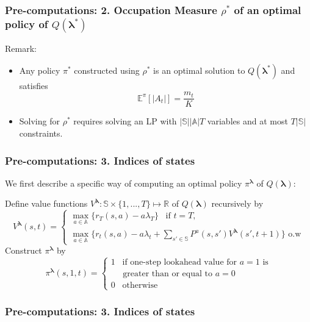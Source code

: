 \documentclass{beamer}
\newcommand{\lambdav}{\pmb{\lambda}}
\newcommand{\substates}{\mathbb{S}}
\newcommand{\subactions}{\mathbb{A}}
\newcommand{\subaction}{a}
\begin{document}
\begin{frame}
\frametitle{Pre-computations: 2. Occupation Measure $\rho^*$ of an optimal policy of $Q(\lambdav^*)$}
Remark: 
\begin{itemize}
\item Any policy $\pi^*$ constructed using $\rho^*$ is an optimal solution to $Q(\lambdav^*)$ and satisfies
\begin{equation}
\mathbb{E}^{\pi}[|A_t|]=\frac{m_t}{K}
\end{equation} 
\item Solving for $\rho^*$ requires solving an LP with $|\substates||\subactions|T$ variables and at most $T|\substates|$ constraints.
\end{itemize}
\end{frame}

\begin{frame}
\frametitle{Pre-computations: 3. Indices of states}

We first describe a specific way of computing an optimal policy $\pi^{\lambdav}$ of $Q(\lambdav)$:

\vspace{0.5cm}
Define value functions $V^{\lambdav}:\substates\times \{1,...,T\}\mapsto \mathbb{R}$ of $Q(\lambdav)$ recursively by
\begin{equation}
V^{\lambdav}(s,t)=
\begin{cases}
	\max_{\subaction\in \subactions}\{r_T(s,a)-a\lambda_T\} \;\;\; \text{if $t=T$,}\\
	\max_{\subaction\in\subactions}\{r_t(s,a)-a\lambda_t+\sum_{s'\in\substates}P^{a}(s,s')V^{\lambdav}(s',t+1)\} \text{ o.w}
\end{cases} 
\end{equation}
Construct $\pi^{\lambdav}$ by
\begin{equation}
\pi^{\lambdav}(s,1,t)=
\begin{cases*}
1\;\;\;\text{if one-step lookahead value for $a=1$ is} \\
\;\;\;\;\;\text{greater than or equal to $a=0$}\\
0 \;\;\;\text{otherwise}
\end{cases*}
\end{equation}
\end{frame}

\begin{frame}
\frametitle{Pre-computations: 3. Indices of states}
\end{frame}
\end{document}
